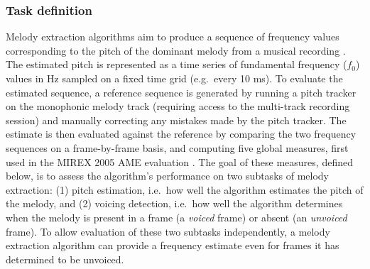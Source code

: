 \documentclass{article}
\begin{document}
\subsubsection{Task definition}
Melody extraction algorithms aim to produce a sequence of frequency values
corresponding to the pitch of the dominant melody from a musical recording
\cite{salamon:MelodyReview:IEEESPM13}. The estimated pitch is represented as a
time series of fundamental frequency ($f_0$) values in Hz sampled on a fixed
time grid (e.g.~every 10 ms). To evaluate the estimated sequence, a reference
sequence is generated by running a pitch tracker on the monophonic melody track
(requiring access to the multi-track recording session) and manually correcting
any mistakes made by the pitch tracker. The estimate is then evaluated against
the reference by comparing the two frequency sequences on a frame-by-frame
basis, and computing five global measures, first used in the MIREX 2005 AME
evaluation \cite{polinerMelodyEval}. The goal of these measures, defined below,
is to assess the algorithm's performance on two subtasks of melody extraction:
(1) pitch estimation, i.e.~how well the algorithm estimates the pitch of the
melody, and (2) voicing detection, i.e.~how well the algorithm determines when
the melody is present in a frame (a \textit{voiced} frame) or absent (an
\textit{unvoiced} frame). To allow evaluation of these two subtasks
independently, a melody extraction algorithm can provide a frequency estimate
even for frames it has determined to be unvoiced.
\end{document}
